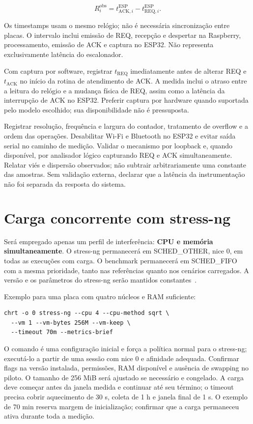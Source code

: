\documentclass[11pt,a4paper]{article}
\begin{document}
\begin{equation}
 R_i^{\mathrm{obs}}=t_{\mathrm{ACK},i}^{\mathrm{ESP}}-t_{\mathrm{REQ},i}^{\mathrm{ESP}}.
\end{equation}

Os timestamps usam o mesmo relógio; não é necessária sincronização entre placas. O intervalo inclui emissão de REQ, recepção e despertar na Raspberry, processamento, emissão de ACK e captura no ESP32. Não representa exclusivamente latência do escalonador.

Com captura por software, registrar $t_{\mathrm{REQ}}$ imediatamente antes de alterar REQ e $t_{\mathrm{ACK}}$ no início da rotina de atendimento de ACK. A medida inclui o atraso entre a leitura do relógio e a mudança física de REQ, assim como a latência da interrupção de ACK no ESP32. Preferir captura por hardware quando suportada pelo modelo escolhido; sua disponibilidade não é pressuposta.

Registrar resolução, frequência e largura do contador, tratamento de overflow e a ordem das operações. Desabilitar Wi-Fi e Bluetooth no ESP32 e evitar saída serial no caminho de medição. Validar o mecanismo por loopback e, quando disponível, por analisador lógico capturando REQ e ACK simultaneamente. Relatar viés e dispersão observados; não subtrair arbitrariamente uma constante das amostras. Sem validação externa, declarar que a latência da instrumentação não foi separada da resposta do sistema.

\section{Carga concorrente com stress-ng}

Será empregado apenas um perfil de interferência: \textbf{CPU e memória simultaneamente}. O stress-ng permanecerá em SCHED\_OTHER, nice 0, em todas as execuções com carga. O benchmark permanecerá em SCHED\_FIFO com a mesma prioridade, tanto nas referências quanto nos cenários carregados. A versão e os parâmetros do stress-ng serão mantidos constantes~\cite{stressng}.

Exemplo para uma placa com quatro núcleos e RAM suficiente:
\begin{lstlisting}
chrt -o 0 stress-ng --cpu 4 --cpu-method sqrt \
  --vm 1 --vm-bytes 256M --vm-keep \
  --timeout 70m --metrics-brief
\end{lstlisting}

O comando é uma configuração inicial e força a política normal para o stress-ng; executá-lo a partir de uma sessão com nice 0 e afinidade adequada. Confirmar flags na versão instalada, permissões, RAM disponível e ausência de swapping no piloto. O tamanho de 256 MiB será ajustado se necessário e congelado. A carga deve começar antes da janela medida e continuar até seu término; o timeout precisa cobrir aquecimento de 30 s, coleta de 1 h e janela final de 1 s. O exemplo de 70 min reserva margem de inicialização; confirmar que a carga permaneceu ativa durante toda a medição.
\end{document}
